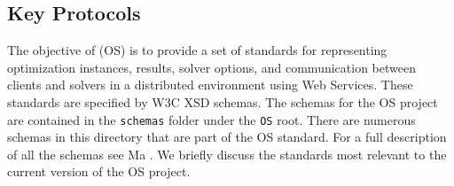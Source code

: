 \documentclass[11pt]{article}
\renewcommand{\_}{{\char"5F}}
\renewcommand{\{}{{\char"7B}}
\renewcommand{\}}{{\char"7D}}
\renewcommand{\^}{{\char"0D}}
\renewcommand{\'}{{\char"0D}}
\begin{document}
\subsection{Key Protocols}\label{section:schemadescriptions}

The objective of  (OS) is to provide a set of standards for representing optimization instances, results, solver options, and communication between clients and solvers in a distributed environment using Web Services.  These standards are specified by W3C XSD schemas. The schemas for the OS project are contained in the {\tt schemas} folder under the {\tt OS} root. There are numerous schemas in this directory that are part of the OS standard. For a full description of all the schemas see  Ma \cite{junma2005}.  We briefly discuss the standards most relevant to the current version of the OS project. 
\end{document}
